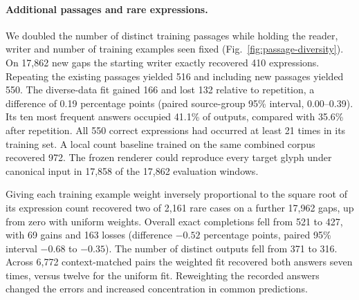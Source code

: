 \paragraph{Additional passages and rare expressions.}
We doubled the number of distinct training passages while holding the reader, writer and number of training examples seen fixed (Fig.~\ref{fig:passage-diversity}). On 17,862 new gaps the starting writer exactly recovered 410 expressions. Repeating the existing passages yielded 516 and including new passages yielded 550. The diverse-data fit gained 166 and lost 132 relative to repetition, a difference of 0.19 percentage points (paired source-group 95\% interval, 0.00--0.39). Its ten most frequent answers occupied 41.1\% of outputs, compared with 35.6\% after repetition. All 550 correct expressions had occurred at least 21 times in its training set. A local count baseline trained on the same combined corpus recovered 972. The frozen renderer could reproduce every target glyph under canonical input in 17,858 of the 17,862 evaluation windows.

Giving each training example weight inversely proportional to the square root of its expression count recovered two of 2,161 rare cases on a further 17,962 gaps, up from zero with uniform weights. Overall exact completions fell from 521 to 427, with 69 gains and 163 losses (difference $-0.52$ percentage points, paired 95\% interval $-0.68$ to $-0.35$). The number of distinct outputs fell from 371 to 316. Across 6,772 context-matched pairs the weighted fit recovered both answers seven times, versus twelve for the uniform fit. Reweighting the recorded answers changed the errors and increased concentration in common predictions.
